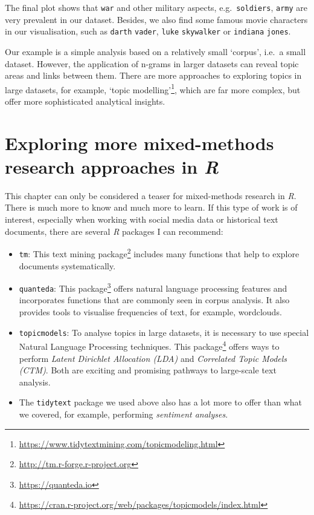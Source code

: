 \documentclass[
  letterpaper,
]{krantz}
\renewcommand{\href}[2]{#2\footnote{\url{#1}}}
\begin{document}
The final plot shows that \texttt{war} and other military aspects,
e.g.~\texttt{soldiers}, \texttt{army} are very prevalent in our dataset.
Besides, we also find some famous movie characters in our visualisation,
such as \texttt{darth} \texttt{vader}, \texttt{luke} \texttt{skywalker}
or \texttt{indiana} \texttt{jones}.

Our example is a simple analysis based on a relatively small `corpus',
i.e.~a small dataset. However, the application of n-grams in larger
datasets can reveal topic areas and links between them. There are more
approaches to exploring topics in large datasets, for example,
\href{https://www.tidytextmining.com/topicmodeling.html}{`topic
modelling'}, which are far more complex, but offer more sophisticated
analytical insights.

\section{\texorpdfstring{Exploring more mixed-methods research
approaches in
\emph{R}}{Exploring more mixed-methods research approaches in R}}\label{exploring-more-mixed-methods-research-approaches-in-r}

This chapter can only be considered a teaser for mixed-methods research
in \emph{R}. There is much more to know and much more to learn. If this
type of work is of interest, especially when working with social media
data or historical text documents, there are several \emph{R} packages I
can recommend:

\begin{itemize}
\item
  \texttt{tm}: This \href{http://tm.r-forge.r-project.org}{text mining
  package} includes many functions that help to explore documents
  systematically.
\item
  \texttt{quanteda}: This \href{https://quanteda.io}{package} offers
  natural language processing features and incorporates functions that
  are commonly seen in corpus analysis. It also provides tools to
  visualise frequencies of text, for example, wordclouds.
\item
  \texttt{topicmodels}: To analyse topics in large datasets, it is
  necessary to use special Natural Language Processing techniques. This
  \href{https://cran.r-project.org/web/packages/topicmodels/index.html}{package}
  offers ways to perform \emph{Latent Dirichlet Allocation (LDA)} and
  \emph{Correlated Topic Models (CTM)}. Both are exciting and promising
  pathways to large-scale text analysis.
\item
  The \texttt{tidytext} package we used above also has a lot more to
  offer than what we covered, for example, performing \emph{sentiment
  analyses}.
\end{itemize}
\end{document}
